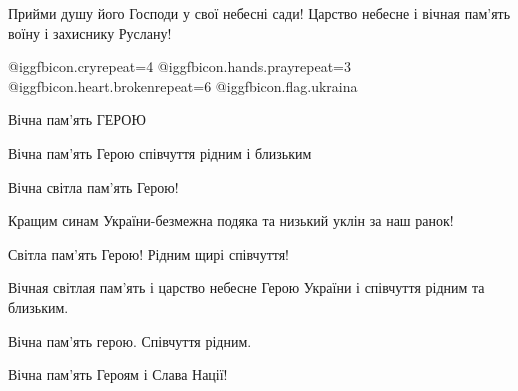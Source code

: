 \begin{itemize}

Прийми душу його Господи у свої небесні сади! Царство небесне і вічная пам'ять
воїну і захиснику Руслану!

 @igg{fbicon.cry}{repeat=4}  @igg{fbicon.hands.pray}{repeat=3}  @igg{fbicon.heart.broken}{repeat=6} 
@igg{fbicon.flag.ukraina}

Вічна пам'ять ГЕРОЮ

Вічна пам'ять Герою співчуття рідним і близьким

Вічна світла пам'ять Герою!


Кращим синам України-безмежна подяка та низький уклін за наш ранок!

Світла пам'ять Герою! Рідним щирі співчуття!

Вічная світлая пам'ять і царство небесне Герою України і співчуття рідним та близьким.

Вічна пам'ять герою. Співчуття рідним.

Вічна пам'ять Героям і Слава Нації!

\end{itemize} %
